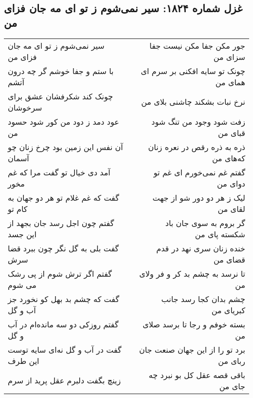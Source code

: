 \begin{center}
\section*{غزل شماره ۱۸۲۴: سیر نمی‌شوم ز تو ای مه جان فزای من}
\label{sec:1824}
\begin{longtable}{l p{0.5cm} r}
سیر نمی‌شوم ز تو ای مه جان فزای من
&&
جور مکن جفا مکن نیست جفا سزای من
\\
با ستم و جفا خوشم گر چه درون آتشم
&&
چونک تو سایه افکنی بر سرم ای همای من
\\
چونک کند شکرفشان عشق برای سرخوشان
&&
نرخ نبات بشکند چاشنی بلای من
\\
عود دمد ز دود من کور شود حسود من
&&
زفت شود وجود من تنگ شود قبای من
\\
آن نفس این زمین بود چرخ زنان چو آسمان
&&
ذره به ذره رقص در نعره زنان که‌های من
\\
آمد دی خیال تو گفت مرا که غم مخور
&&
گفتم غم نمی‌خورم ای غم تو دوای من
\\
گفت که غم غلام تو هر دو جهان به کام تو
&&
لیک ز هر دو دور شو از جهت لقای من
\\
گفتم چون اجل رسد جان بجهد از این جسد
&&
گر بروم به سوی جان باد شکسته پای من
\\
گفت بلی به گل نگر چون ببرد قضا سرش
&&
خنده زنان سری نهد در قدم قضای من
\\
گفتم اگر ترش شوم از پی رشک می شوم
&&
تا نرسد به چشم بد کر و فر ولای من
\\
گفت که چشم بد بهل کو نخورد جز آب و گل
&&
چشم بدان کجا رسد جانب کبریای من
\\
گفتم روزکی دو سه مانده‌ام در آب و گل
&&
بسته خوفم و رجا تا برسد صلای من
\\
گفت در آب و گل نه‌ای سایه توست این طرف
&&
برد تو را از این جهان صنعت جان ربای من
\\
زینچ بگفت دلبرم عقل پرید از سرم
&&
باقی قصه عقل کل بو نبرد چه جای من
\\
\end{longtable}
\end{center}
